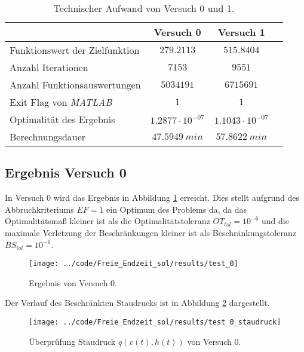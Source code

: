 \begin{table}[H]
    \centering
    \caption{Technischer Aufwand von Versuch 0 und 1.}\label{tab:Versuch_TA}
    \begin{tabularx}{.9\textwidth}{Zccc}
        \toprule
         & \textbf{Versuch 0} & \textbf{Versuch 1} \\
        \midrule
        Funktionswert der Zielfunktion & $279.2113$ & $515.8404$ \\
        Anzahl Iterationen & $7153$ & $9551$ \\
        Anzahl Funktionsauswertungen & $5034191$ & $6715691$ \\
        Exit Flag von \textit{MATLAB} & $1$ & $1$ \\
        Optimalität des Ergebnis & $1.2877 \cdot 10^{-07}$ & $1.1043 \cdot 10^{-07}$ \\
        Berechnungsdauer & $47.5949 \ min$ & $57.8622 \ min$ \\
        \bottomrule
    \end{tabularx}
\end{table}




\subsection{Ergebnis Versuch 0}\label{kap:Versuch0_OptTf}
In Versuch 0 wird das Ergebnis in Abbildung \ref{img:test_0_OptTf} erreicht. Dies stellt aufgrund des Abbruchkriteriums $EF = 1$ ein Optimum des Problems da, da das Optimalitätsmaß kleiner ist als die Optimalitätstoleranz $OT_{tol} = 10^{-6}$ und die maximale Verletzung der Beschränkungen kleiner ist als Beschränkungstoleranz $BS_{tol} = 10^{-6}$.
\begin{figure}[H]
\begin{center}
\texttt{[image: ../code/Freie\_Endzeit\_sol/results/test\_0]}
\caption{Ergebnis von Versuch 0.}\label{img:test_0_OptTf}
\end{center}
\end{figure}
Der Verlauf des Beschränkten Staudrucks ist in Abbildung \ref{img:test_0_staudruck_OptTf} dargestellt.
\begin{figure}[H]
\begin{center}
\texttt{[image: ../code/Freie\_Endzeit\_sol/results/test\_0\_staudruck]}
\caption{Überprüfung Staudruck $q(v(t),h(t))$ von Versuch 0.} \label{img:test_0_staudruck_OptTf}
\end{center}
\end{figure}





